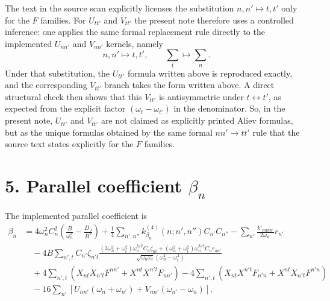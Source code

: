 \documentclass[11pt]{article}
\begin{document}
The text in the source scan explicitly licenses the substitution
$n,n'\mapsto t,t'$ only for the $F$ families. For $U_{tt'}$ and $V_{tt'}$ the
present note therefore uses a controlled inference: one applies the same formal
replacement rule directly to the implemented $U_{nn'}$ and $V_{nn'}$ kernels,
namely
\[
n,n' \mapsto t,t',
\qquad
\sum_t \mapsto \sum_n.
\]
Under that substitution, the $U_{tt'}$ formula written above is reproduced
exactly, and the corresponding $V_{tt'}$ branch takes the form written above.
A direct structural check then shows that this $V_{tt'}$ is antisymmetric under
$t\leftrightarrow t'$, as expected from the explicit factor
$(\omega_t-\omega_{t'})$ in the denominator. So, in the present note,
$U_{tt'}$ and $V_{tt'}$ are not claimed as explicitly printed Aliev formulas,
but as the unique formulas obtained by the same formal $nn'\to tt'$ rule that
the source text states explicitly for the $F$ families.

\section*{5. Parallel coefficient \texorpdfstring{$\beta_n$}{beta n}}

The implemented parallel coefficient is
\begin{equation}
\begin{aligned}
\beta_n &=
4\omega_n^2 C_n^2\left(\frac{B}{\omega_n^2}-\frac{D_J}{B^2}\right)
+ \frac{1}{4}\sum_{n',n''} k^{(4)}_{\beta_n}(n;n',n'') C_{n'}C_{n''}
- \sum_{n'} \frac{k'_{nnnn'}}{2\omega_{n'}} r_{n'}
\\[0.4em]
&\quad
- 4B\sum_{n',t} C_{n'}\zeta_{n't}
\frac{
(3\omega_n^2+\omega_t^2)\omega_n^{3/2} C_n \zeta_{nt}
+
(\omega_n^2+\omega_t^2)\omega_n^{3/2} C_n r_{nn'}
}
{\sqrt{\omega_n\omega_t}(\omega_n^2-\omega_t^2)}
\\[0.4em]
&\quad
+ 4\sum_{n',t}\left(X_{nt}X_{n't}F^{nn'} + X^{nt}X^{n't}F_{nn'}\right)
- 4\sum_{n',t}\left(X_{nt}X^{n't}F_{n'n} + X^{nt}X_{n't}F^{n'n}\right)
\\[0.4em]
&\quad
- 16\sum_{n'}
\left[U_{nn'}(\omega_n+\omega_{n'}) + V_{nn'}(\omega_{n'}-\omega_n)\right].
\end{aligned}
\end{equation}
\end{document}

